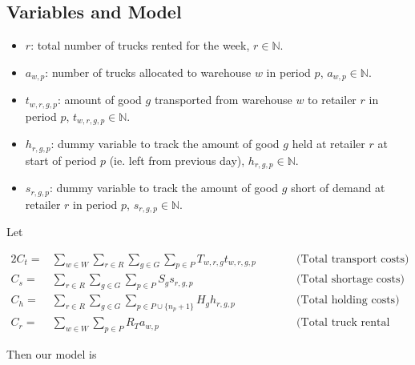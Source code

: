 \documentclass[a4paper,12pt]{article}
\begin{document}
\subsection{Variables and Model}\label{subsec:variables-and-model}
\begin{itemize}
    \item $r$: total number of trucks rented for the week, $r \in \mathbb{N}$.
    \item $a_{w,p}$: number of trucks allocated to warehouse $w$ in period $p$, $a_{w,p} \in \mathbb{N}$.
    \item $t_{w,r,g,p}$: amount of good $g$ transported from warehouse $w$ to retailer $r$ in period $p$, $t_{w,r,g,p} \in \mathbb{N}$.
    \item $h_{r,g,p}$: dummy variable to track the amount of good $g$ held at retailer $r$ at start of period $p$ (ie. left from previous day), $h_{r,g,p} \in \mathbb{N}$.
    \item $s_{r,g,p}$: dummy variable to track the amount of good $g$ short of demand at retailer $r$ in period $p$, $s_{r,g,p} \in \mathbb{N}$.
\end{itemize}

Let

\begin{alignat}{2}
    C_t = & \sum_{w \in W}\sum_{r \in R}\sum_{g \in G}\sum_{p \in P} T_{w,r,g} t_{w,r,g,p}  & \quad & \quad \text{(Total transport costs)} \\
    C_s = & \sum_{r \in R}\sum_{g \in G}\sum_{p \in P} S_{g} s_{r,g,p}  & \quad & \quad \text{(Total shortage costs)}\\
    C_h = & \sum_{r \in R}\sum_{g \in G}\sum_{p \in P \cup \{n_p + 1\}} H_{g} h_{r,g,p}  & \quad & \quad \text{(Total holding costs)}\\
    C_r = & \sum_{w \in W}\sum_{p \in P} R_T a_{w,p}  & \quad & \quad \text{(Total truck rental costs)}
\end{alignat}

Then our model is
\end{document}
